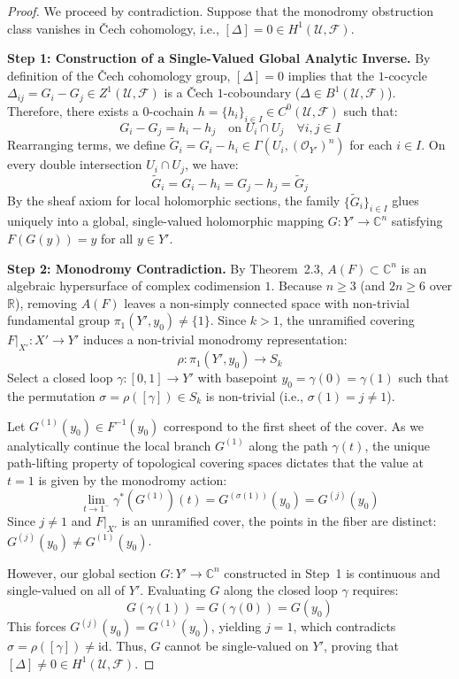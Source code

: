 \documentclass[11pt,reqno]{amsart}
\theoremstyle{definition}
\begin{document}
\begin{proof}
We proceed by contradiction. Suppose that the monodromy obstruction class vanishes in \v{C}ech cohomology, i.e., $[\Delta] = 0 \in H^1(\mathcal{U}, \mathcal{F})$.

\textbf{Step 1: Construction of a Single-Valued Global Analytic Inverse.}
By definition of the \v{C}ech cohomology group, $[\Delta] = 0$ implies that the $1$-cocycle $\Delta_{ij} = G_i - G_j \in Z^1(\mathcal{U}, \mathcal{F})$ is a \v{C}ech $1$-coboundary ($\Delta \in B^1(\mathcal{U}, \mathcal{F})$). Therefore, there exists a $0$-cochain $h = \{h_i\}_{i \in I} \in C^0(\mathcal{U}, \mathcal{F})$ such that:
$$G_i - G_j = h_i - h_j \quad \text{on } U_i \cap U_j \quad \forall i, j \in I$$
Rearranging terms, we define $\tilde{G}_i = G_i - h_i \in \Gamma(U_i, (\mathcal{O}_{Y'})^n)$ for each $i \in I$. On every double intersection $U_i \cap U_j$, we have:
$$\tilde{G}_i = G_i - h_i = G_j - h_j = \tilde{G}_j$$
By the sheaf axiom for local holomorphic sections, the family $\{\tilde{G}_i\}_{i \in I}$ glues uniquely into a global, single-valued holomorphic mapping $G: Y' \to \mathbb{C}^n$ satisfying $F(G(y)) = y$ for all $y \in Y'$.

\textbf{Step 2: Monodromy Contradiction.}
By Theorem~2.3, $A(F) \subset \mathbb{C}^n$ is an algebraic hypersurface of complex codimension $1$. Because $n \ge 3$ (and $2n \ge 6$ over $\mathbb{R}$), removing $A(F)$ leaves a non-simply connected space with non-trivial fundamental group $\pi_1(Y', y_0) \neq \{1\}$. Since $k > 1$, the unramified covering $F\big|_{X'}: X' \to Y'$ induces a non-trivial monodromy representation:
$$\rho: \pi_1(Y', y_0) \longrightarrow S_k$$
Select a closed loop $\gamma: [0, 1] \to Y'$ with basepoint $y_0 = \gamma(0) = \gamma(1)$ such that the permutation $\sigma = \rho([\gamma]) \in S_k$ is non-trivial (i.e., $\sigma(1) = j \neq 1$).

Let $G^{(1)}(y_0) \in F^{-1}(y_0)$ correspond to the first sheet of the cover. As we analytically continue the local branch $G^{(1)}$ along the path $\gamma(t)$, the unique path-lifting property of topological covering spaces dictates that the value at $t = 1$ is given by the monodromy action:
$$\lim_{t \to 1^-} \gamma^*(G^{(1)})(t) = G^{(\sigma(1))}(y_0) = G^{(j)}(y_0)$$
Since $j \neq 1$ and $F\big|_{X'}$ is an unramified cover, the points in the fiber are distinct: $G^{(j)}(y_0) \neq G^{(1)}(y_0)$. 

However, our global section $G: Y' \to \mathbb{C}^n$ constructed in Step~1 is continuous and single-valued on all of $Y'$. Evaluating $G$ along the closed loop $\gamma$ requires:
$$G(\gamma(1)) = G(\gamma(0)) = G(y_0)$$
This forces $G^{(j)}(y_0) = G^{(1)}(y_0)$, yielding $j = 1$, which contradicts $\sigma = \rho([\gamma]) \neq \mathrm{id}$. Thus, $G$ cannot be single-valued on $Y'$, proving that $[\Delta] \neq 0 \in H^1(\mathcal{U}, \mathcal{F})$.


\end{proof}
\end{document}
